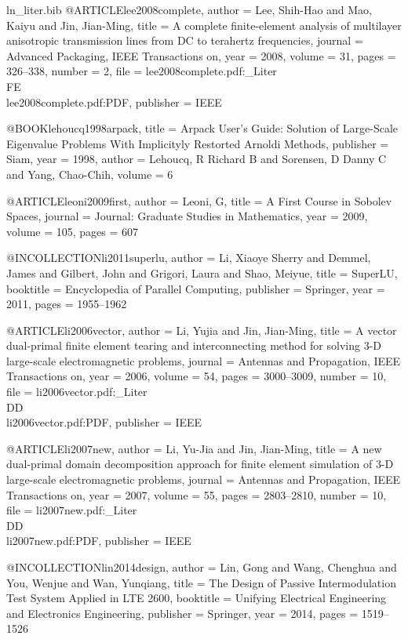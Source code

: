 \begin{filecontents*}{ln_liter.bib}
@ARTICLE{lee2008complete,
  author = {Lee, Shih-Hao and Mao, Kaiyu and Jin, Jian-Ming},
  title = {A complete finite-element analysis of multilayer anisotropic transmission
	lines from DC to terahertz frequencies},
  journal = {Advanced Packaging, IEEE Transactions on},
  year = {2008},
  volume = {31},
  pages = {326--338},
  number = {2},
  file = {lee2008complete.pdf:_Liter\\FE\\lee2008complete.pdf:PDF},
  publisher = {IEEE}
}

@BOOK{lehoucq1998arpack,
  title = {Arpack User's Guide: Solution of Large-Scale Eigenvalue Problems
	With Implicityly Restorted Arnoldi Methods},
  publisher = {Siam},
  year = {1998},
  author = {Lehoucq, R Richard B and Sorensen, D Danny C and Yang, Chao-Chih},
  volume = {6}
}

@ARTICLE{leoni2009first,
  author = {Leoni, G},
  title = {A First Course in Sobolev Spaces},
  journal = {Journal: Graduate Studies in Mathematics},
  year = {2009},
  volume = {105},
  pages = {607}
}

@INCOLLECTION{li2011superlu,
  author = {Li, Xiaoye Sherry and Demmel, James and Gilbert, John and Grigori,
	Laura and Shao, Meiyue},
  title = {{SuperLU}},
  booktitle = {Encyclopedia of Parallel Computing},
  publisher = {Springer},
  year = {2011},
  pages = {1955--1962}
}

@ARTICLE{li2006vector,
  author = {Li, Yujia and Jin, Jian-Ming},
  title = {A vector dual-primal finite element tearing and interconnecting method
	for solving {3-D} large-scale electromagnetic problems},
  journal = {Antennas and Propagation, IEEE Transactions on},
  year = {2006},
  volume = {54},
  pages = {3000--3009},
  number = {10},
  file = {li2006vector.pdf:_Liter\\DD\\li2006vector.pdf:PDF},
  publisher = {IEEE}
}

@ARTICLE{li2007new,
  author = {Li, Yu-Jia and Jin, Jian-Ming},
  title = {A new dual-primal domain decomposition approach for finite element
	simulation of {3-D} large-scale electromagnetic problems},
  journal = {Antennas and Propagation, IEEE Transactions on},
  year = {2007},
  volume = {55},
  pages = {2803--2810},
  number = {10},
  file = {li2007new.pdf:_Liter\\DD\\li2007new.pdf:PDF},
  publisher = {IEEE}
}

@INCOLLECTION{lin2014design,
  author = {Lin, Gong and Wang, Chenghua and You, Wenjue and Wan, Yunqiang},
  title = {The Design of Passive Intermodulation Test System Applied in LTE
	2600},
  booktitle = {Unifying Electrical Engineering and Electronics Engineering},
  publisher = {Springer},
  year = {2014},
  pages = {1519--1526}
}


\end{filecontents*}
